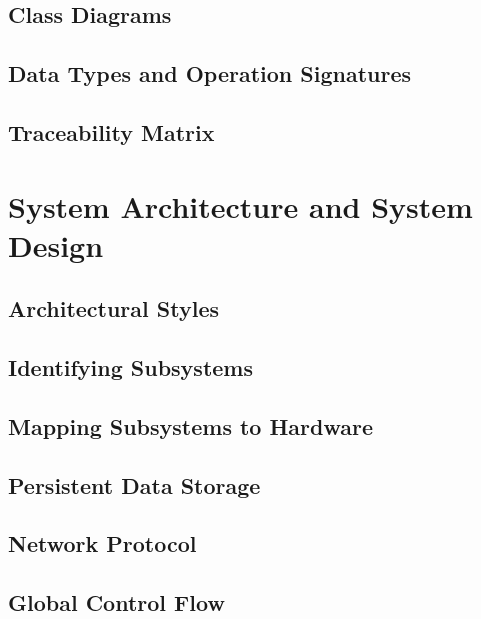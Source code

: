 \documentclass[letterpaper,english, 12pt]{scrreprt}
\begin{document}
\section{Class Diagrams}
    

\section{Data Types and Operation Signatures}
    

\section{Traceability Matrix}
    


\chapter{System Architecture and System Design}

\section{Architectural Styles}
    
    
\section{Identifying Subsystems}
    

\section{Mapping Subsystems to Hardware}
    
    
\section{Persistent Data Storage}
    
\section{Network Protocol}
    
    
\section{Global Control Flow}
    
\end{document}
